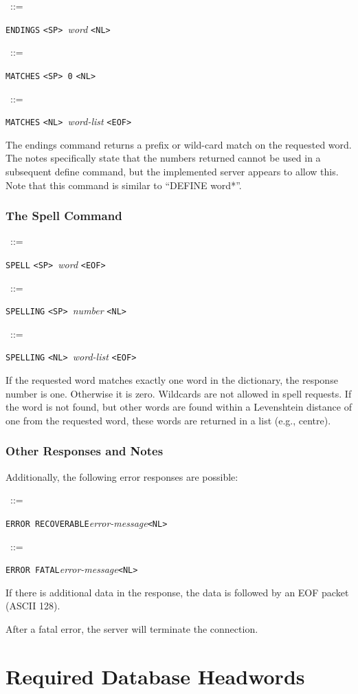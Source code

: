 \documentclass{article}
\newcommand{\SP}{\mbox{\tt <SP>\ }}
\newcommand{\NL}{\mbox{\tt <NL>\ }}
\newcommand{\EOF}{\mbox{\tt <EOF>\ }}
\newcommand{\note}{\bigskip\par\noindent}
\newcommand{\prd}[3][]{\noindent\begin{leftline}\hspace{1em}{\it #2}\ ::=\ %
  \begin{minipage}[t]{.64\textwidth}\raggedright #3\end{minipage}%
    \ifthenelse{\equal{#1}{}}{}%
    {\begin{minipage}[t]{.54\textwidth}\raggedright #1\end{minipage}%
      \vspace{1ex}}%
    \end{leftline}}
\newcommand{\lhs}[1]{{\it #1\/}}
\newcommand{\lit}[1]{{\tt #1}}
\begin{document}
\prd{endings}{\lit{ENDINGS} \SP \lhs{word} \NL}
\prd{endings-response}{\lit{MATCHES} \SP \lit{0} \NL}
\prd{endings-response}{\lit{MATCHES} \NL \lhs{word-list} \EOF}

\note The endings command returns a prefix or wild-card match on the
requested word.  The notes specifically state that the numbers returned
cannot be used in a subsequent define command, but the implemented server
appears to allow this.  Note that this command is similar to ``DEFINE
word*''.


\subsubsection{The Spell Command}

\prd{spell}{\lit{SPELL} \SP \lhs{word} \EOF}
\prd{spell-response}{\lit{SPELLING} \SP \lhs{number} \NL}
\prd{spell-response}{\lit{SPELLING} \NL \lhs{word-list} \EOF}

\note If the requested word matches exactly one word in the dictionary, the
response number is one.  Otherwise it is zero.  Wildcards are not allowed
in spell requests.  If the word is not found, but other words are found
within a Levenshtein distance of one from the requested word, these words
are returned in a list (e.g., centre).

\subsubsection{Other Responses and Notes}

Additionally, the following error responses are possible:

\prd{error}{\lit{ERROR RECOVERABLE}\lhs{error-message}\NL}
\prd{error}{\lit{ERROR FATAL}\lhs{error-message}\NL}

\note If there is additional data in the response, the data is followed by
an EOF packet (ASCII 128).

After a fatal error, the server will terminate the connection.

\section{Required Database Headwords}
\end{document}
